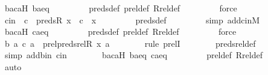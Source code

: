 \begin{isabellebody}
\ bacaH\ baeq\ \isanewline
\ \ \ \ \ \ \isamarkupfalse%
\ preds{\isacharunderscore}{\kern0pt}def\ prel{\isacharunderscore}{\kern0pt}def\ Rrel{\isacharunderscore}{\kern0pt}def\ \isanewline
\ \ \ \ \ \ \isamarkupfalse%
\ force\isanewline
\ \ \ \ \ \ \isanewline
\ \ \ \ \isamarkupfalse%
\ cin\ {\isacharcolon}{\kern0pt}\ {\isachardoublequoteopen}c\ {\isasymin}\ preds{\isacharparenleft}{\kern0pt}R{\isacharcomma}{\kern0pt}\ x{\isacharparenright}{\kern0pt}\ {\isasymor}\ c\ {\isacharequal}{\kern0pt}\ x{\isachardoublequoteclose}\ \isanewline
\ \ \ \ \ \ \isamarkupfalse%
\ preds{\isacharunderscore}{\kern0pt}def\ \isanewline
\ \ \ \ \ \ \isamarkupfalse%
\ {\isacharparenleft}{\kern0pt}simp\ add{\isacharcolon}{\kern0pt}cinM{\isacharparenright}{\kern0pt}\isanewline
\ \ \ \ \ \ \isamarkupfalse%
\ bacaH\ caeq\ \isanewline
\ \ \ \ \ \ \isamarkupfalse%
\ preds{\isacharunderscore}{\kern0pt}def\ prel{\isacharunderscore}{\kern0pt}def\ Rrel{\isacharunderscore}{\kern0pt}def\ \isanewline
\ \ \ \ \ \ \isamarkupfalse%
\ force\isanewline
\isanewline
\ \ \ \ \isamarkupfalse%
\ {\isachardoublequoteopen}{\isacharless}{\kern0pt}{\isacharless}{\kern0pt}b{\isacharcomma}{\kern0pt}\ a{\isachargreater}{\kern0pt}{\isacharcomma}{\kern0pt}\ {\isacharless}{\kern0pt}c{\isacharcomma}{\kern0pt}\ a{\isachargreater}{\kern0pt}{\isachargreater}{\kern0pt}\ {\isasymin}\ prel{\isacharparenleft}{\kern0pt}preds{\isacharunderscore}{\kern0pt}rel{\isacharparenleft}{\kern0pt}R{\isacharcomma}{\kern0pt}\ x{\isacharparenright}{\kern0pt}{\isacharcomma}{\kern0pt}\ {\isacharbraceleft}{\kern0pt}a{\isacharbraceright}{\kern0pt}{\isacharparenright}{\kern0pt}{\isachardoublequoteclose}\ \isanewline
\ \ \ \ \ \ \isamarkupfalse%
{\isacharparenleft}{\kern0pt}rule\ prelI{\isacharparenright}{\kern0pt}\isanewline
\ \ \ \ \ \ \isamarkupfalse%
\ preds{\isacharunderscore}{\kern0pt}rel{\isacharunderscore}{\kern0pt}def\ \isanewline
\ \ \ \ \ \ \ \isamarkupfalse%
\ {\isacharparenleft}{\kern0pt}simp\ add{\isacharcolon}{\kern0pt}bin\ cin{\isacharparenright}{\kern0pt}\isanewline
\ \ \ \ \ \ \isamarkupfalse%
\ bacaH\ baeq\ caeq\ \isanewline
\ \ \ \ \ \ \isamarkupfalse%
\ prel{\isacharunderscore}{\kern0pt}def\ Rrel{\isacharunderscore}{\kern0pt}def\ \isanewline
\ \ \ \ \ \ \isamarkupfalse%
\ auto\ \isanewline
\ \ \ \ \isamarkupfalse%
\ \isamarkupfalse%

\end{isabellebody}
